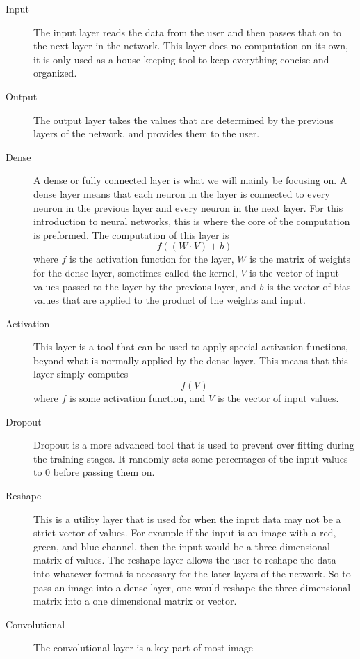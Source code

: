\documentclass[10pt]{amsart}
\begin{document}
\begin{multicols}{2}
  \begin{description}
    \item[Input] The input layer reads the data from the user and then passes
      that on to the next layer in the network. This layer does no computation
      on its own, it is only used as a house keeping tool to keep everything
      concise and organized.
    \item[Output] The output layer takes the values that are determined by the
      previous layers of the network, and provides them to the user.
    \item[Dense] A dense or fully connected layer is what we will mainly be
      focusing on. A dense layer means that each neuron in the layer is
      connected to every neuron in the previous layer and every neuron in the
      next layer. For this introduction to neural networks, this is where the
      core of the computation is preformed. The computation of this layer is
      \[
        f((W\cdot V) + b)
      \]
      where $f$ is the activation function for the layer, $W$ is the matrix of
      weights for the dense layer, sometimes called the kernel, $V$ is the
      vector of input values passed to the layer by the previous layer, and $b$
      is the vector of bias values that are applied to the product of the
      weights and input.
    \item[Activation] This layer is a tool that can be used to apply special
      activation functions, beyond what is normally applied by the dense layer.
      This means that this layer simply computes
      \[
        f(V)
      \]
      where $f$ is some activation function, and $V$ is the vector of input
      values.
    \item[Dropout] Dropout is a more advanced tool that is used to prevent
      over fitting during the training stages. It randomly sets some
      percentages of the input values to $0$ before passing them on.
    \item[Reshape] This is a utility layer that is used for when the input data
      may not be a strict vector of values. For example if the input is an
      image with a red, green, and blue channel, then the input would be a
      three dimensional matrix of values. The reshape layer allows the user to
      reshape the data into whatever format is necessary for the later layers
      of the network. So to pass an image into a dense layer, one would reshape
      the three dimensional matrix into a one dimensional matrix or vector.
    \item[Convolutional] The convolutional layer is a key part of most image

\end{description}
\end{multicols}
\end{document}
